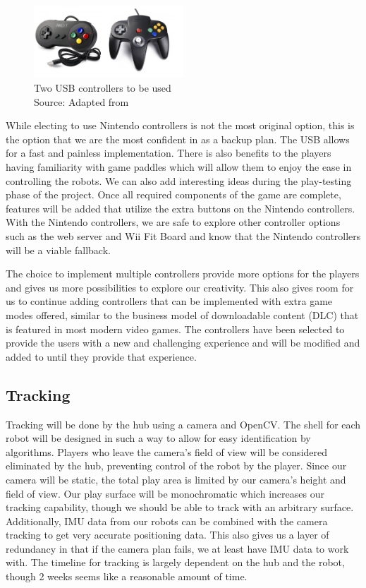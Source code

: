 \documentclass[11pt]{ieeeconf}
\begin{document}
\begin{figure}[H]
\centering
\captionsetup{justification=centering}
\includegraphics[width=0.5\textwidth]{images/controllers.png}
\caption{Two USB controllers to be used \\ Source: Adapted from \cite{controller:19}}
\label{Controllers}
\end{figure}

While electing to use Nintendo controllers is not the most original option, this is the option that we are the most confident in as a backup plan. The USB allows for a fast and painless implementation. There is also benefits to the players having familiarity with game paddles which will allow them to enjoy the ease in controlling the robots. We can also add interesting ideas during the play-testing phase of the project. Once all required components of the game are complete, features will be added that utilize the extra buttons on the Nintendo controllers. With the Nintendo controllers, we are safe to explore other controller options such as the web server and Wii Fit Board and know that the Nintendo controllers will be a viable fallback. 

The choice to implement multiple controllers provide more options for the players and gives us more possibilities to explore our creativity. This also gives room for us to continue adding controllers that can be implemented with extra game modes offered, similar to the business model of downloadable content (DLC) that is featured in most modern video games. The controllers have been selected to provide the users with a new and challenging experience and will be modified and added to until they provide that experience. 

\subsection{Tracking}

Tracking will be done by the hub using a camera and OpenCV. The shell for each robot will be designed in such a way to allow for easy identification by algorithms. Players who leave the camera's field of view will be considered eliminated by the hub, preventing control of the robot by the player. Since our camera will be static, the total play area is limited by our camera's height and field of view. Our play surface will be monochromatic which increases our tracking capability, though we should be able to track with an arbitrary surface. Additionally, IMU data from our robots can be combined with the camera tracking to get very accurate positioning data. This also gives us a layer of redundancy in that if the camera plan fails, we at least have IMU data to work with. The timeline for tracking is largely dependent on the hub and the robot, though 2 weeks seems like a reasonable amount of time.
\end{document}
